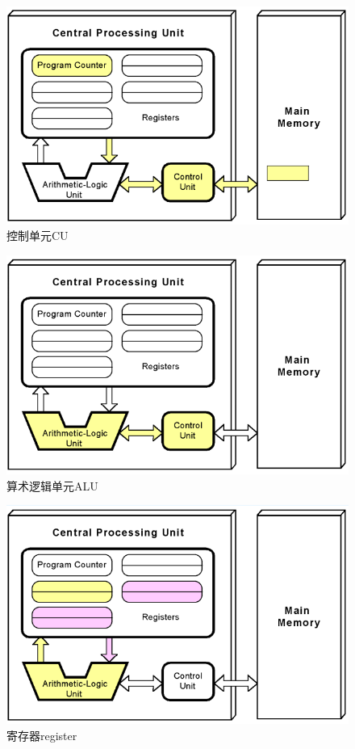 \begin{figure}[H]
	\centering
	\includegraphics[scale=0.55]{img/C1/1-3/2.png}
	\caption{控制单元CU}
\end{figure}

\begin{figure}[H]
	\centering
	\includegraphics[scale=0.55]{img/C1/1-3/3.png}
	\caption{算术逻辑单元ALU}
\end{figure}

\begin{figure}[H]
	\centering
	\includegraphics[scale=0.55]{img/C1/1-3/4.png}
	\caption{寄存器register}
\end{figure}

